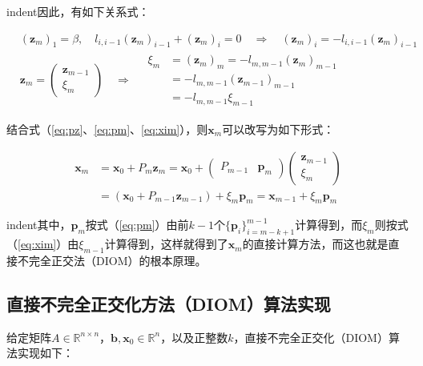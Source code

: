 \documentclass[UTF8,nofonts]{ctexart}
\begin{document}
indent因此，有如下关系式：

\begin{eqnarray}
& (\boldsymbol{z}_m)_1=\beta,\quad l_{i,i-1}(\boldsymbol{z}_m)_{i-1} + (\boldsymbol{z}_m)_i=0\quad\Longrightarrow\quad(\boldsymbol{z}_m)_i=-l_{i,i-1}(\boldsymbol{z}_m)_{i-1} \nonumber \\
& \boldsymbol{z}_m=\begin{pmatrix}\boldsymbol{z}_{m-1}\\\xi_m\end{pmatrix}\quad\Longrightarrow\quad
\begin{aligned}\xi_{m}&=(\boldsymbol{z}_m)_m=-l_{m,m-1}(\boldsymbol{z}_m)_{m-1}\\
&=-l_{m,m-1}(\boldsymbol{z}_{m-1})_{m-1} \\
&=-l_{m,m-1}\xi_{m-1}
\end{aligned} \label{eq:xim}
\end{eqnarray}

结合式（\ref{eq:pz}、\ref{eq:pm}、\ref{eq:xim}），则$\boldsymbol{x}_m$可以改写为如下形式：

\begin{align*}
\boldsymbol{x}_m&=\boldsymbol{x}_0+P_m\boldsymbol{z}_m=\boldsymbol{x}_0+\begin{pmatrix}P_{m-1} & \boldsymbol{p}_m\end{pmatrix}\begin{pmatrix}\boldsymbol{z}_{m-1}\\\xi_m\end{pmatrix} \\
&= (\boldsymbol{x}_0+P_{m-1}\boldsymbol{z}_{m-1})+\xi_m\boldsymbol{p}_m=\boldsymbol{x}_{m-1}+\xi_m\boldsymbol{p}_m
\end{align*}

indent其中，$\boldsymbol{p}_m$按式（\ref{eq:pm}）由前$k-1$个$\{\boldsymbol{p}_i\}_{i=m-k+1}^{m-1}$计算得到，而$\xi_m$则按式（\ref{eq:xim}）由$\xi_{m-1}$计算得到，这样就得到了$\boldsymbol{x}_m$的直接计算方法，而这也就是直接不完全正交法（DIOM）的根本原理。

\subsection*{直接不完全正交化方法（DIOM）算法实现}

给定矩阵$A\in\mathbb{R}^{n \times n}$，$\boldsymbol{b},\boldsymbol{x}_0\in\mathbb{R}^{n}$，以及正整数$k$，直接不完全正交化（DIOM）算法实现如下：
\end{document}
